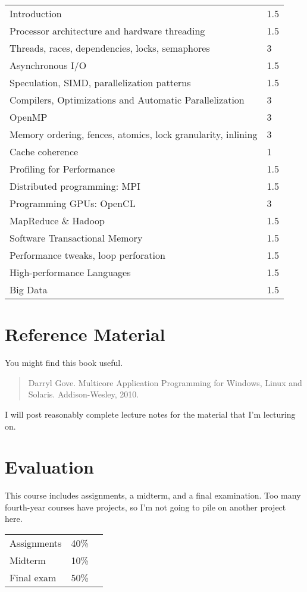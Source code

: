 \documentclass{article}
\begin{document}
\begin{tabular}{ll}
Introduction & 1.5 \\
Processor architecture and hardware threading & 1.5 \\
Threads, races, dependencies, locks, semaphores & 3 \\
Asynchronous I/O & 1.5 \\
Speculation, SIMD, parallelization patterns & 1.5 \\
Compilers, Optimizations and Automatic Parallelization & 3 \\
OpenMP & 3 \\
Memory ordering, fences, atomics, lock granularity, inlining & 3 \\
Cache coherence & 1 \\
Profiling for Performance & 1.5 \\
Distributed programming: MPI & 1.5\\
Programming GPUs: OpenCL & 3 \\
MapReduce \& Hadoop & 1.5 \\
Software Transactional Memory & 1.5 \\
Performance tweaks, loop perforation & 1.5 \\
High-performance Languages & 1.5 \\
Big Data & 1.5 
\end{tabular}

\section*{Reference Material}
You might find this book useful.

\begin{quote}
    Darryl Gove. Multicore Application Programming for Windows, Linux and Solaris. Addison-Wesley, 2010.
\end{quote}

\noindent
I will post reasonably complete lecture notes for the material
that I'm lecturing on.

\newpage
\section*{Evaluation}
This course includes assignments, a midterm, and a final
examination. Too many fourth-year courses have projects, so I'm not
going to pile on another project here.

\begin{tabular}{lrl}
Assignments & 40\% \\
Midterm & 10\% \\
Final exam & 50\% \\
\end{tabular}
\end{document}

